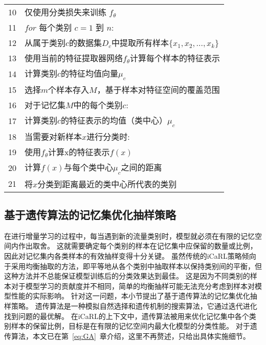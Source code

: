 \begin{table}[htbp]
\begin{tabularx}{1.0\textwidth}{cl}
		10 & \quad\quad\quad\quad 仅使用分类损失来训练 $f_{\theta}$                                                    \\
		11 & \quad\quad $for$ 每个类别 $c=1$ 到 $n$:                                                                   \\
		12 & \quad\quad\quad\quad 从属于类别$c$的数据集$D_c$中提取所有样本$\{x_1, x_2, ..., x_k\}$                     \\
		13 & \quad\quad\quad\quad 使用当前的特征提取器网络$f_{\theta}$计算每个样本的特征表示                           \\
		14 & \quad\quad\quad\quad 计算类别$c$的特征均值向量$\mu_c$                                                     \\
		15 & \quad\quad\quad\quad 选择$m$个样本存入$M$，基于样本对特征空间的覆盖范围                                   \\
		16 & \quad\quad 对于记忆集$M$中的每个类别$c$:                                                                  \\
		17 & \quad\quad\quad\quad 计算类别$c$的特征表示的均值（类中心）$\mu_c$                                         \\
		18 & \quad\quad 当需要对新样本$x$进行分类时:                                                                   \\
		19 & \quad\quad\quad\quad 使用$f_{\theta}$计算x的特征表示$f(x)$                                                \\
		20 & \quad\quad\quad\quad 计算$f(x)$与每个类中心$\mu_c$之间的距离                                              \\
		21 & \quad\quad\quad\quad 将$x$分类到距离最近的类中心所代表的类别                                              \\
		\bottomrule
	\end{tabularx}
\end{table}

\subsection{基于遗传算法的记忆集优化抽样策略}
在进行增量学习的过程中，每当遇到新的流量类别时，模型就必须在有限的记忆空间内作出取舍。
这就需要确定每个类别的样本在记忆集中应保留的数量或比例，因此对记忆集内各类样本的有效抽样变得十分关键。
虽然传统的iCaRL策略倾向于采用均衡抽取的方法，即平等地从各个类别中抽取样本以保持类别间的平衡，但这种方法并不总能保证模型训练后的分类效果达到最佳。
这是因为不同类别的样本对于模型学习的贡献度并不相同，简单的均衡抽样可能无法充分考虑到样本对模型性能的实际影响。
针对这一问题，本小节提出了基于遗传算法的记忆集优化抽样策略。
遗传算法是一种模拟自然选择和遗传机制的搜索算法，它通过迭代进化找到问题的最优解。
在iCaRL的上下文中，遗传算法被用来优化记忆集中各个类别样本的保留比例，目标是在有限的记忆空间内最大化模型的分类性能。
对于遗传算法，本文已在第~\ref{eq:GA}~章介绍，这里不再赘述，只给出具体实施细节。\par

